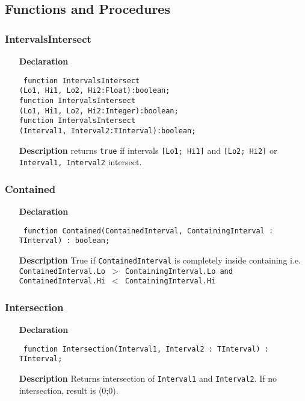 \documentclass[12pt,a4paper,oneside]{report}
\newcommand{\declarationitem}[1]{\textbf{#1}}
\newcommand{\descriptiontitle}[1]{\textbf{#1}}
\newcommand{\code}[1]{\texttt{#1}}
\begin{document}
\subsection{Functions and Procedures}
\subsubsection{IntervalsIntersect}
\label{uIntervals-IntervalsIntersect}
\begin{itemize}\item[\declarationitem{Declaration}\hfill]
\begin{flushleft}
\code{
function IntervalsIntersect\\
\hspace{3cm}(Lo1, Hi1, Lo2, Hi2:Float):boolean;\\[6pt]
function IntervalsIntersect\\
\hspace{3cm}(Lo1, Hi1, Lo2, Hi2:Integer):boolean;\\[6pt]
function IntervalsIntersect\\
\hspace{3cm}(Interval1, Interval2:TInterval):boolean;}
\end{flushleft}
\item[\descriptiontitle{Description}]
returns \code{true} if intervals \code{[Lo1; Hi1]} and \code{[Lo2; Hi2]} or \code{Interval1, Interval2} intersect.
\end{itemize}
\subsubsection{Contained}
\label{uIntervals-Contained}
\begin{itemize}\item[\declarationitem{Declaration}\hfill]
\begin{flushleft}
\code{
function Contained(ContainedInterval, ContainingInterval : TInterval) : boolean;}
\end{flushleft}
\item[\descriptiontitle{Description}]
True if \code{ContainedInterval} is completely inside containing i.e. \code{ContainedInterval.Lo {$>$} ContainingInterval.Lo and ContainedInterval.Hi {$<$} ContainingInterval.Hi}

\end{itemize}
\subsubsection{Intersection}
\label{uIntervals-Intersection}
\begin{itemize}\item[\declarationitem{Declaration}\hfill]
\begin{flushleft}
\code{
function Intersection(Interval1, Interval2 : TInterval) : TInterval;}
\end{flushleft}

\item[\descriptiontitle{Description}]
Returns intersection of \code{Interval1} and \code{Interval2}. If no intersection, result is (0;0).
\end{itemize}
\end{document}
